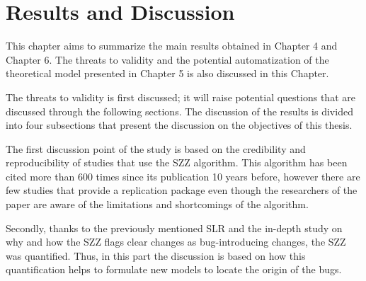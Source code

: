 \documentclass[a4paper, 12pt]{book}
\begin{document}

\vspace{0.2cm}
\vspace{0.1cm}



\cleardoublepage
\chapter{Results and Discussion}
\label{chap:discussion}

This chapter aims to summarize the main results obtained in Chapter 4 and Chapter 6. The threats to validity and the potential automatization of the theoretical model presented in Chapter 5 is also discussed in this Chapter. 

The threats to validity is first discussed; it will raise potential questions that are discussed through the following sections. The discussion of the results is divided into four subsections that present the discussion on  the objectives of this thesis.

The first discussion point of the study is based on the credibility and reproducibility of studies that use the SZZ algorithm. This algorithm has been cited more than 600 times since its publication 10 years before, however there are few studies that provide a replication package even though the researchers of the paper are aware of the limitations and shortcomings of the algorithm.

Secondly, thanks to the previously mentioned SLR and the in-depth study on why and how the SZZ flags clear changes as bug-introducing changes, the SZZ was quantified. Thus, in this part the discussion is based on how this quantification helps to formulate new models to locate the origin of the bugs.
\end{document}
